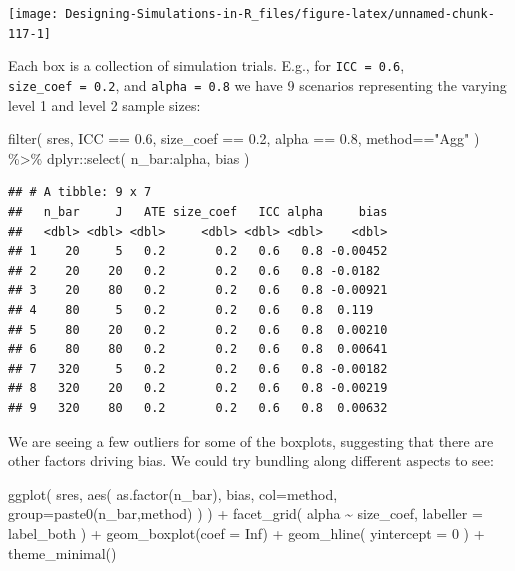 \documentclass[
]{book}
\newenvironment{Shaded}{\begin{snugshade}}{\end{snugshade}}
\newcommand{\AttributeTok}[1]{\textcolor[rgb]{0.77,0.63,0.00}{#1}}
\newcommand{\ConstantTok}[1]{\textcolor[rgb]{0.00,0.00,0.00}{#1}}
\newcommand{\DecValTok}[1]{\textcolor[rgb]{0.00,0.00,0.81}{#1}}
\newcommand{\FloatTok}[1]{\textcolor[rgb]{0.00,0.00,0.81}{#1}}
\newcommand{\FunctionTok}[1]{\textcolor[rgb]{0.00,0.00,0.00}{#1}}
\newcommand{\NormalTok}[1]{#1}
\newcommand{\SpecialCharTok}[1]{\textcolor[rgb]{0.00,0.00,0.00}{#1}}
\newcommand{\StringTok}[1]{\textcolor[rgb]{0.31,0.60,0.02}{#1}}
\begin{document}
\begin{center}\texttt{[image: Designing-Simulations-in-R\_files/figure-latex/unnamed-chunk-117-1]} \end{center}

Each box is a collection of simulation trials. E.g., for \texttt{ICC\ =\ 0.6}, \texttt{size\_coef\ =\ 0.2}, and \texttt{alpha\ =\ 0.8} we have 9 scenarios representing the varying level 1 and level 2 sample sizes:

\begin{Shaded}
\begin{Highlighting}[]
\FunctionTok{filter}\NormalTok{( sres, ICC }\SpecialCharTok{==} \FloatTok{0.6}\NormalTok{, size\_coef }\SpecialCharTok{==} \FloatTok{0.2}\NormalTok{,}
\NormalTok{        alpha }\SpecialCharTok{==} \FloatTok{0.8}\NormalTok{, method}\SpecialCharTok{==}\StringTok{"Agg"}\NormalTok{ ) }\SpecialCharTok{\%\textgreater{}\%}
\NormalTok{  dplyr}\SpecialCharTok{::}\FunctionTok{select}\NormalTok{( n\_bar}\SpecialCharTok{:}\NormalTok{alpha, bias )}
\end{Highlighting}
\end{Shaded}

\begin{verbatim}
## # A tibble: 9 x 7
##   n_bar     J   ATE size_coef   ICC alpha     bias
##   <dbl> <dbl> <dbl>     <dbl> <dbl> <dbl>    <dbl>
## 1    20     5   0.2       0.2   0.6   0.8 -0.00452
## 2    20    20   0.2       0.2   0.6   0.8 -0.0182 
## 3    20    80   0.2       0.2   0.6   0.8 -0.00921
## 4    80     5   0.2       0.2   0.6   0.8  0.119  
## 5    80    20   0.2       0.2   0.6   0.8  0.00210
## 6    80    80   0.2       0.2   0.6   0.8  0.00641
## 7   320     5   0.2       0.2   0.6   0.8 -0.00182
## 8   320    20   0.2       0.2   0.6   0.8 -0.00219
## 9   320    80   0.2       0.2   0.6   0.8  0.00632
\end{verbatim}

We are seeing a few outliers for some of the boxplots, suggesting that there are other factors driving bias. We could try bundling along different aspects to see:

\begin{Shaded}
\begin{Highlighting}[]
\FunctionTok{ggplot}\NormalTok{( sres, }\FunctionTok{aes}\NormalTok{( }\FunctionTok{as.factor}\NormalTok{(n\_bar), bias, }\AttributeTok{col=}\NormalTok{method, }\AttributeTok{group=}\FunctionTok{paste0}\NormalTok{(n\_bar,method) ) ) }\SpecialCharTok{+}
  \FunctionTok{facet\_grid}\NormalTok{( alpha }\SpecialCharTok{\textasciitilde{}}\NormalTok{  size\_coef, }\AttributeTok{labeller =}\NormalTok{ label\_both ) }\SpecialCharTok{+}
  \FunctionTok{geom\_boxplot}\NormalTok{(}\AttributeTok{coef =} \ConstantTok{Inf}\NormalTok{) }\SpecialCharTok{+}
  \FunctionTok{geom\_hline}\NormalTok{( }\AttributeTok{yintercept =} \DecValTok{0}\NormalTok{ ) }\SpecialCharTok{+}
  \FunctionTok{theme\_minimal}\NormalTok{()}
\end{Highlighting}
\end{Shaded}
\end{document}
